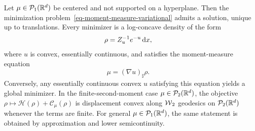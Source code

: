 \begin{prop}\label{prop-moment-hidden-convexity}
	Let $\mu\in\mathcal{P}_1(\mathbb{R}^d)$ be centered and not supported on a hyperplane. Then the minimization problem~\eqref{eq-moment-measure-variational} admits a solution, unique up to translations. Every minimizer is a log-concave density of the form
	\[
		\rho=Z_u^{-1}e^{-u}\,\mathrm{d} x,
	\]
	where $u$ is convex, essentially continuous, and satisfies the moment-measure equation
	\[
		\mu=(\nabla u)_\sharp \rho .
	\]
	Conversely, any essentially continuous convex $u$ satisfying this equation yields a global minimizer. In the finite-second-moment case $\mu\in\mathcal{P}_2(\mathbb{R}^d)$, the objective $\rho\mapsto\mathcal H(\rho)+\mathcal C_\mu(\rho)$ is displacement convex along $\operatorname{\mathcal{W}}_2$ geodesics on $\mathcal{P}_2(\mathbb{R}^d)$ whenever the terms are finite. For general $\mu\in\mathcal{P}_1(\mathbb{R}^d)$, the same statement is obtained by approximation and lower semicontinuity.
\end{prop}

